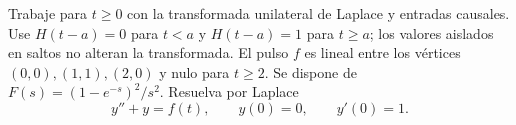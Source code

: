 Trabaje para $t\ge0$ con la transformada unilateral de Laplace y entradas causales. Use $H(t-a)=0$ para $t<a$ y $H(t-a)=1$ para $t\ge a$; los valores aislados en saltos no alteran la transformada. El pulso $f$ es lineal entre los vértices $(0,0),(1,1),(2,0)$ y nulo para $t\ge2$. Se dispone de $F(s)=(1-e^{-s})^2/s^2$. Resuelva por Laplace
\[y''+y=f(t),\qquad y(0)=0,\qquad y'(0)=1.\]
